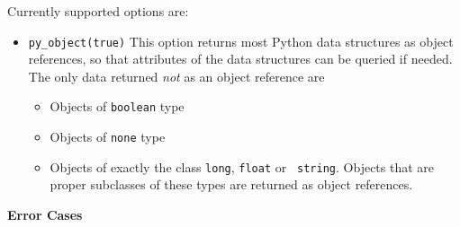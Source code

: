\begin{description}
Currently supported options are:
\begin{itemize}
  \item {\tt py\_object(true)} This option returns most Python data
    structures as object references, so that attributes of the data
    structures can be queried if needed.  The only data returned {\em
      not} as an object reference are
    \begin{itemize}
    \item Objects of {\tt boolean} type
    \item Objects of {\tt none} type
    \item Objects of exactly the class {\tt long}, {\tt float} or {\tt
      string}.  Objects that are proper subclasses of these types are
      returned as object references.
    \end{itemize}
\end{itemize}

{\bf Error Cases}


\end{description}
